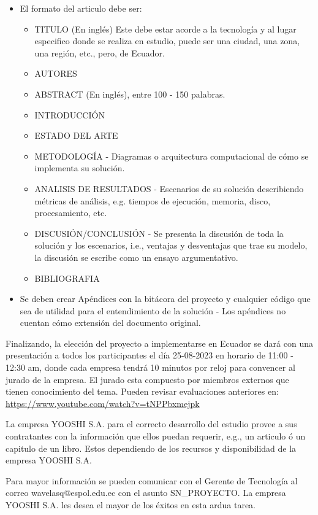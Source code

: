 \begin{itemize}
    \item El formato del articulo debe ser:
    \begin{itemize}
        \item TITULO (En inglés) Este debe estar acorde a la tecnología y al lugar especifico donde se realiza en estudio, puede ser una ciudad, una zona, una región, etc., pero, de Ecuador. 
        \item AUTORES
        \item ABSTRACT (En inglés), entre 100 - 150 palabras.
        \item INTRODUCCIÓN
        \item ESTADO DEL ARTE
        \item METODOLOGÍA - Diagramas o arquitectura computacional de cómo se implementa su solución.
        \item ANALISIS DE RESULTADOS - Escenarios de su solución describiendo métricas de análisis, e.g. tiempos de ejecución, memoria, disco, procesamiento, etc.
        \item DISCUSIÓN/CONCLUSIÓN - Se presenta la discusión de toda la solución y los escenarios, i.e., ventajas y desventajas que trae su modelo, la discusión se escribe como un ensayo argumentativo.
        \item BIBLIOGRAFIA 
    \end{itemize}

    \item Se deben crear Apéndices con la bitácora del proyecto y cualquier código que sea de utilidad para el entendimiento de la solución - Los apéndices no cuentan cómo extensión del documento original.


\end{itemize}

Finalizando, la elección del proyecto a implementarse en Ecuador se dará con una presentación a todos los participantes el día 25-08-2023 en horario de 11:00 - 12:30 am, donde cada empresa tendrá 10 minutos por reloj para convencer al jurado de la empresa. El jurado esta compuesto por miembros externos que tienen conocimiento del tema. Pueden revisar evaluaciones anteriores en:
\url{https://www.youtube.com/watch?v=tNPPbxmejpk}

La empresa YOOSHI S.A. para el correcto desarrollo del estudio provee a sus contratantes con la información que ellos puedan requerir, e.g., un articulo ó un capitulo de un libro. Estos dependiendo de los recursos y disponibilidad de la empresa YOOSHI S.A.

Para mayor información se pueden comunicar con el Gerente de Tecnología al correo wavelasq@espol.edu.ec  con el asunto SN\_PROYECTO.
La empresa YOOSHI S.A. les desea el mayor de los éxitos en esta ardua tarea. 

